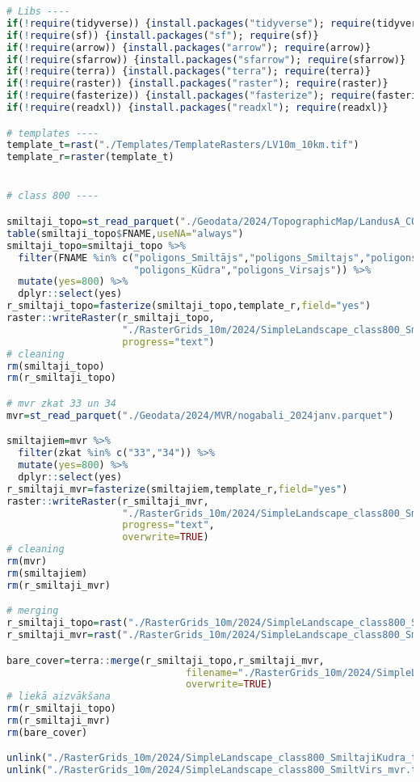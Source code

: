\documentclass[
]{book}
\begin{document}
\begin{lstlisting}[language=R]
# Libs ----
if(!require(tidyverse)) {install.packages("tidyverse"); require(tidyverse)}
if(!require(sf)) {install.packages("sf"); require(sf)}
if(!require(arrow)) {install.packages("arrow"); require(arrow)}
if(!require(sfarrow)) {install.packages("sfarrow"); require(sfarrow)}
if(!require(terra)) {install.packages("terra"); require(terra)}
if(!require(raster)) {install.packages("raster"); require(raster)}
if(!require(fasterize)) {install.packages("fasterize"); require(fasterize)}
if(!require(readxl)) {install.packages("readxl"); require(readxl)}

# templates ----
template_t=rast("./Templates/TemplateRasters/LV10m_10km.tif")
template_r=raster(template_t)


# class 800 ----

smiltaji_topo=st_read_parquet("./Geodata/2024/TopographicMap/LandusA_COMB.parquet")
table(smiltaji_topo$FNAME,useNA="always")
smiltaji_topo=smiltaji_topo %>% 
  filter(FNAME %in% c("poligons_Smiltājs","poligons_Smiltajs","poligons_Grants",
                      "poligons_Kūdra","poligons_Virsajs")) %>% 
  mutate(yes=800) %>% 
  dplyr::select(yes)
r_smiltaji_topo=fasterize(smiltaji_topo,template_r,field="yes")
raster::writeRaster(r_smiltaji_topo,
                    "./RasterGrids_10m/2024/SimpleLandscape_class800_SmiltajiKudra_topo.tif",
                    progress="text")
# cleaning
rm(smiltaji_topo)
rm(r_smiltaji_topo)

# mvr zkat 33 un 34
mvr=st_read_parquet("./Geodata/2024/MVR/nogabali_2024janv.parquet")

smiltajiem=mvr %>% 
  filter(zkat %in% c("33","34")) %>% 
  mutate(yes=800) %>% 
  dplyr::select(yes)
r_smiltaji_mvr=fasterize(smiltajiem,template_r,field="yes")
raster::writeRaster(r_smiltaji_mvr,
                    "./RasterGrids_10m/2024/SimpleLandscape_class800_SmiltVirs_mvr.tif",
                    progress="text",
                    overwrite=TRUE)
# cleaning
rm(mvr)
rm(smiltajiem)
rm(r_smiltaji_mvr)

# merging
r_smiltaji_topo=rast("./RasterGrids_10m/2024/SimpleLandscape_class800_SmiltajiKudra_topo.tif")
r_smiltaji_mvr=rast("./RasterGrids_10m/2024/SimpleLandscape_class800_SmiltVirs_mvr.tif")

bare_cover=terra::merge(r_smiltaji_topo,r_smiltaji_mvr,
                               filename="./RasterGrids_10m/2024/SimpleLandscape_class800_smiltaji_premask.tif",
                               overwrite=TRUE)
# liekā aizvākšana
rm(r_smiltaji_topo)
rm(r_smiltaji_mvr)
rm(bare_cover)

unlink("./RasterGrids_10m/2024/SimpleLandscape_class800_SmiltajiKudra_topo.tif")
unlink("./RasterGrids_10m/2024/SimpleLandscape_class800_SmiltVirs_mvr.tif")
\end{lstlisting}
\end{document}
